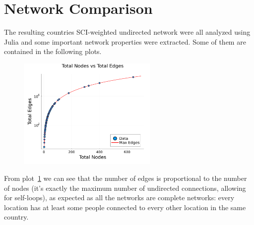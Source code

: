 \section{Network Comparison}
The resulting countries SCI-weighted undirected network were all analyzed using Julia and some important network properties were extracted. Some of them are contained in the following plots.

\begin{figure}[H]
    \centering
    \includegraphics[width=0.6\textwidth]{images/task44/TotalNodesVsTotalEdges.png}
    \caption{}
    \label{fig:TotalNodesVsTotalEdges}
\end{figure}

From plot~\ref{fig:TotalNodesVsTotalEdges} we can see that the number of edges is proportional to the number of nodes (it's exactly the maximum number of undirected connections, allowing for self-loops), as expected as all the networks are complete networks: every location has at least some people connected to every other location in the same country.

